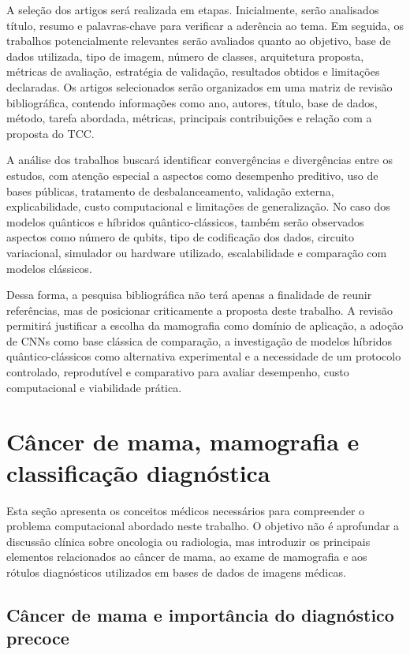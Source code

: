 \documentclass[
    12pt,
    openright,
    oneside,
    a4paper,
    english,
    brazil
]{abntex2}
\begin{document}
A seleção dos artigos será realizada em etapas. Inicialmente, serão analisados título, resumo e palavras-chave para verificar a aderência ao tema. Em seguida, os trabalhos potencialmente relevantes serão avaliados quanto ao objetivo, base de dados utilizada, tipo de imagem, número de classes, arquitetura proposta, métricas de avaliação, estratégia de validação, resultados obtidos e limitações declaradas. Os artigos selecionados serão organizados em uma matriz de revisão bibliográfica, contendo informações como ano, autores, título, base de dados, método, tarefa abordada, métricas, principais contribuições e relação com a proposta do TCC.

A análise dos trabalhos buscará identificar convergências e divergências entre os estudos, com atenção especial a aspectos como desempenho preditivo, uso de bases públicas, tratamento de desbalanceamento, validação externa, explicabilidade, custo computacional e limitações de generalização. No caso dos modelos quânticos e híbridos quântico-clássicos, também serão observados aspectos como número de qubits, tipo de codificação dos dados, circuito variacional, simulador ou hardware utilizado, escalabilidade e comparação com modelos clássicos.

Dessa forma, a pesquisa bibliográfica não terá apenas a finalidade de reunir referências, mas de posicionar criticamente a proposta deste trabalho. A revisão permitirá justificar a escolha da mamografia como domínio de aplicação, a adoção de CNNs como base clássica de comparação, a investigação de modelos híbridos quântico-clássicos como alternativa experimental e a necessidade de um protocolo controlado, reprodutível e comparativo para avaliar desempenho, custo computacional e viabilidade prática.

\section{Câncer de mama, mamografia e classificação diagnóstica}

Esta seção apresenta os conceitos médicos necessários para compreender o problema computacional abordado neste trabalho. O objetivo não é aprofundar a discussão clínica sobre oncologia ou radiologia, mas introduzir os principais elementos relacionados ao câncer de mama, ao exame de mamografia e aos rótulos diagnósticos utilizados em bases de dados de imagens médicas.

\subsection{Câncer de mama e importância do diagnóstico precoce}
\end{document}

